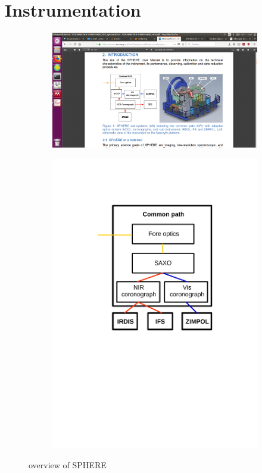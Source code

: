 \documentclass[twoside,single]{lion-msc}
\begin{document}
\chapter{Instrumentation}
\begin{figure}[hb]
\centering
\begin{subfigure}{.6\textwidth}
  \centering
  \includegraphics[trim={25cm 6cm 7cm 8.8cm},clip,width = 1\linewidth]{overviewSPHERE}
  \caption{\citep{Observatory2007}}
\end{subfigure}%
\begin{subfigure}{.4\textwidth}
  \centering
  \includegraphics[trim={5cm 12cm 3.5cm 3.5cm},clip,width=1\linewidth]{overview_SPHERE}
  \caption{}
\end{subfigure}
\caption{overview of SPHERE}
\label{fig:masterdark}
\end{figure}
\end{document}
